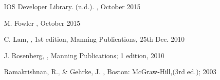 \documentclass[a4paper, 11pt]{article}
\begin{document}
\begin{thebibliography}{29}
IOS Developer Library. (n.d.). \emph{}, October 2015
\vspace{\baselineskip}

M. Fowler \emph{}, October 2015
\vspace{\baselineskip}

C. Lam, \emph{}, 1st edition, Manning Publications, 25th Dec. 2010
\vspace{\baselineskip}

J. Rosenberg, \emph{}, Manning Publications; 1 edition, 2010
\vspace{\baselineskip}

Ramakrishnan, R., \& Gehrke, J. \emph{}, Boston: McGraw-Hill,(3rd ed.); 2003
\vspace{\baselineskip}

\end{thebibliography}
\end{document}
